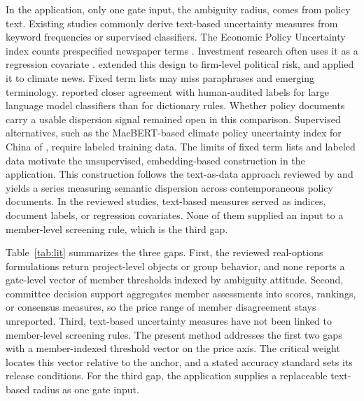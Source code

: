 In the application, only one gate input, the ambiguity radius, comes from policy text. Existing studies commonly derive text-based uncertainty measures from keyword frequencies or supervised classifiers. The Economic Policy Uncertainty index counts prespecified newspaper terms \citep{Baker2016}. Investment research often uses it as a regression covariate \citep{GulenIon2016}. \citet{Hassan2019} extended this design to firm-level political risk, and \citet{Gavriilidis2021} applied it to climate news. Fixed term lists may miss paraphrases and emerging terminology. \citet{Hartley2025} reported closer agreement with human-audited labels for large language model classifiers than for dictionary rules. Whether policy documents carry a usable dispersion signal remained open in this comparison. Supervised alternatives, such as the MacBERT-based climate policy uncertainty index for China of \citet{Ma2023}, require labeled training data. The limits of fixed term lists and labeled data motivate the unsupervised, embedding-based construction in the application. This construction follows the text-as-data approach reviewed by \citet{Gentzkow2019} and yields a series measuring semantic dispersion across contemporaneous policy documents. In the reviewed studies, text-based measures served as indices, document labels, or regression covariates. None of them supplied an input to a member-level screening rule, which is the third gap.

Table~\ref{tab:lit} summarizes the three gaps. First, the reviewed real-options formulations return project-level objects or group behavior, and none reports a gate-level vector of member thresholds indexed by ambiguity attitude. Second, committee decision support aggregates member assessments into scores, rankings, or consensus measures, so the price range of member disagreement stays unreported. Third, text-based uncertainty measures have not been linked to member-level screening rules. The present method addresses the first two gaps with a member-indexed threshold vector on the price axis. The critical weight locates this vector relative to the anchor, and a stated accuracy standard sets its release conditions. For the third gap, the application supplies a replaceable text-based radius as one gate input.

